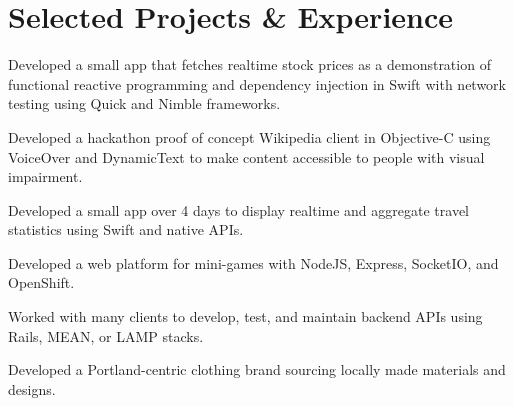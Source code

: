 \documentclass[]{jhearn-resume}
\begin{document}
\begin{minipage}[t]{0.67\textwidth} 
\vspace{-11pt}
\noindent\makebox[\linewidth]{\rule{1000pt}{0.4pt}}
\vspace{-5pt}


\section{Selected Projects \& Experience}

Developed a small app that fetches realtime stock prices as a demonstration of functional reactive programming and dependency injection in Swift with network testing using Quick and Nimble frameworks.
\sectionsep

Developed a hackathon proof of concept Wikipedia client in Objective-C using VoiceOver and DynamicText to make content accessible to people with visual impairment.

\sectionsep

Developed a small app over 4 days to display realtime and aggregate travel statistics using Swift and native APIs.
\sectionsep

Developed a web platform for mini-games with NodeJS, Express, SocketIO, and OpenShift.
\sectionsep

Worked with many clients to develop, test, and maintain backend APIs using Rails, MEAN, or LAMP stacks.
\sectionsep

Developed a Portland-centric clothing brand sourcing locally made materials and designs.
\sectionsep


\end{minipage}
\end{document}
